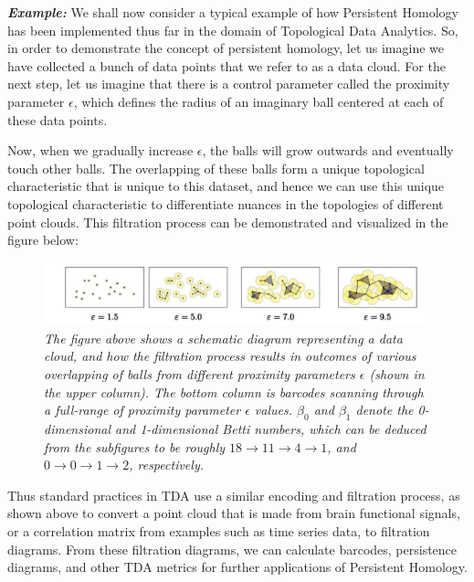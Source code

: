 \textbf{\textit{Example:}}  We shall now consider a typical example of how Persistent  Homology has been implemented thus far in the domain of Topological Data Analytics. So, in order to demonstrate the concept of  persistent homology, let us imagine we have collected a bunch of data points that we refer to as a data cloud. For the next step, let us imagine that there is a control parameter called the proximity parameter $\epsilon$, which defines the radius of an imaginary ball centered at each of these data points.\cite{01_GCarlssonEpstein2011} \cite{02.1_GCarlson2004topoEstimation}\cite{03.6_2015persistentHomo}

Now, when we gradually increase $\epsilon$, the balls will grow outwards and eventually touch other balls. The overlapping of these balls form a unique topological characteristic that is unique to this dataset, and hence we can use this unique topological characteristic to differentiate nuances in the topologies of different point clouds. This filtration process can be demonstrated and visualized in the figure below:\cite{06.2_carlsson2009Multipersistence}

\begin{figure}
	\centering
        \includegraphics[width=1.0\linewidth]{images/Persitent Homology Point Cloud Filtration Process.jpg}
	\caption{\textit{The figure above shows a schematic diagram representing a data cloud, and how the filtration process results in outcomes of various overlapping of balls from different proximity parameters $\epsilon$ (shown in the upper column). The bottom column is barcodes scanning through a full-range of proximity parameter $\epsilon$ values. $\beta_0$ and  $\beta_1$ denote the 0-dimensional and 1-dimensional Betti numbers, which can be deduced from the subfigures to be roughly $18\rightarrow11\rightarrow4\rightarrow1$, and $0\rightarrow0\rightarrow1\rightarrow2$, respectively.}}
	\label{fig:example_pipeline_fig}
\end{figure}

Thus standard practices in TDA use a similar  encoding and filtration process, as shown above to convert a point cloud that is made from brain functional signals, or a correlation matrix from examples such as time series data, to filtration diagrams. From these filtration diagrams, we can calculate barcodes, persistence diagrams, and other TDA metrics for further applications of Persistent Homology.\cite{03.4_2008localizedHomology}\cite{03.3_de2007PersistentHomology}

